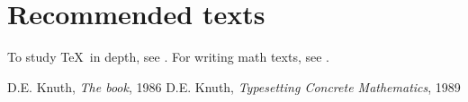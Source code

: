 \documentclass{article}
\begin{document}
\section*{Recommended texts}
To study \TeX\ in depth, see \cite{DK86}. For writing math texts,
see \cite{DK89}.
\begin{thebibliography}{8}
 D.E. Knuth, \emph{The {\Tex}book}, 1986
 D.E. Knuth, \emph{Typesetting Concrete Mathematics}, 1989
\end{thebibliography}
\end{document}
